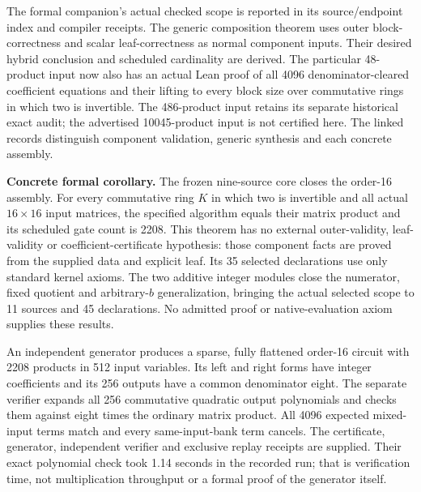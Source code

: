 \documentclass[
  11pt,
]{article}
\begin{document}
The formal companion's actual checked scope is reported in its
source/endpoint index and compiler receipts. The generic composition
theorem uses outer block-correctness and scalar leaf-correctness as
normal component inputs. Their desired hybrid conclusion and scheduled
cardinality are derived. The particular 48-product input now also has an
actual Lean proof of all 4096 denominator-cleared coefficient equations
and their lifting to every block size over commutative rings in which
two is invertible. The 486-product input retains its separate historical
exact audit; the advertised 10045-product input is not certified here.
The linked records distinguish component validation, generic synthesis
and each concrete assembly.

\textbf{Concrete formal corollary.} The frozen nine-source core closes
the order-16 assembly. For every commutative ring \(K\) in which two is
invertible and all actual \(16\times16\) input matrices, the specified
algorithm equals their matrix product and its scheduled gate count is
2208. This theorem has no external outer-validity, leaf-validity or
coefficient-certificate hypothesis: those component facts are proved
from the supplied data and explicit leaf. Its 35 selected declarations
use only standard kernel axioms. The two additive integer modules close
the numerator, fixed quotient and arbitrary-\(b\) generalization,
bringing the actual selected scope to 11 sources and 45 declarations. No
admitted proof or native-evaluation axiom supplies these results.

An independent generator produces a sparse, fully flattened order-16
circuit with 2208 products in 512 input variables. Its left and right
forms have integer coefficients and its 256 outputs have a common
denominator eight. The separate verifier expands all 256 commutative
quadratic output polynomials and checks them against eight times the
ordinary matrix product. All 4096 expected mixed-input terms match and
every same-input-bank term cancels. The certificate, generator,
independent verifier and exclusive replay receipts are supplied. Their
exact polynomial check took 1.14 seconds in the recorded run; that is
verification time, not multiplication throughput or a formal proof of
the generator itself.
\end{document}
